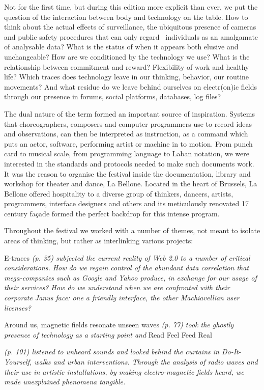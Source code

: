 {{{Not for the first time, but during this edition more explicit than ever, we put the question of the interaction between body and technology on the table. How to think about the actual effects of surveillance, the ubiquitous presence of cameras and public safety procedures that can only regard \ individuals as an amalgamate of analysable data? What is the status of  when it appears both elusive and unchangeable? How are we conditioned by the technology we use? What is the relationship between commitment and reward? Flexibility of work and healthy life? Which traces does technology leave in our thinking, behavior, our routine movements? And what residue do we leave behind ourselves on electr(on)ic fields through our presence in forums, social platforms, databases, log files?

The dual nature of the term  formed an important source of inspiration. Systems that choreographers, composers and computer programmers use to record ideas and observations, can then be interpreted as instruction, as a command which puts an actor, software, performing artist or machine in to motion. From punch card to musical scale, from programming language to Laban notation, we were interested in the standards and protocols needed to make such documents work. It was the reason to organise the festival inside the documentation, library and workshop for theater and dance,  La Bellone. Located in the heart of Brussels, La Bellone offered hospitality to a diverse group of thinkers, dancers, artists, programmers, interface designers and others and its meticulously renovated 17 century fa\c{c}ade formed the perfect backdrop for this intense program.

Throughout the festival we worked with a number of themes, not meant to isolate areas of thinking, but rather as  interlinking various projects: }

E-traces {\em (p. 35) subjected the current reality of Web 2.0 to a number of critical considerations. How do we regain control of the abundant data correlation that mega-companies such as Google and Yahoo produce, in exchange for our usage of their services? How do we understand  when we are confronted with their corporate Janus face: one a friendly interface, the other Machiavellian user licenses?}

Around us, magnetic fields resonate unseen waves {\em (p. 77) took the ghostly presence of technology as a starting point and} Read Feel Feed Real {\em (p. 101) listened to unheard sounds and looked behind the curtains in Do-It-Yourself, walks and urban interventions. Through the analysis of radio waves and their use in artistic installations, by making electro-magnetic fields heard, we made unexplained phenomena tangible. 

}}}
